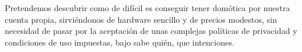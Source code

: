 \vspace{0.5cm}

Pretendemos descubrir como de difícil es conseguir tener domótica por nuestra cuenta propia, sirviéndonos de hardware sencillo y de precios modestos, sin necesidad de pasar por la aceptación de unas complejas políticas de privacidad y condiciones de uso impuestas, bajo sabe quién, que intenciones.

